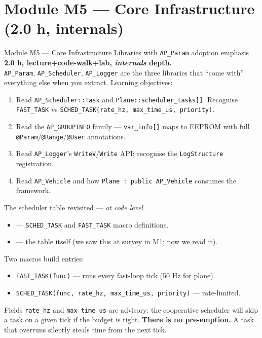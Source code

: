 \documentclass[aspectratio=169,11pt]{beamer}
\begin{document}
\section{Module M5 --- Core Infrastructure (2.0 h, internals)}

\begin{frame}{Module M5 --- Core Infrastructure Libraries with \texttt{AP\_Param} adoption emphasis}
  \textbf{2.0 h, lecture+code-walk+lab, \emph{internals} depth.}\\[1ex]
  \texttt{AP\_Param}, \texttt{AP\_Scheduler}, \texttt{AP\_Logger} are the three libraries that ``come with'' everything else when you extract.
  \vfill
  Learning objectives:
  \begin{enumerate}
    \item Read \texttt{AP\_Scheduler::Task} and \texttt{Plane::scheduler\_tasks[]}. Recognise \texttt{FAST\_TASK} vs \texttt{SCHED\_TASK(rate\_hz, max\_time\_us, priority)}.
    \item Read the \texttt{AP\_GROUPINFO} family --- \texttt{var\_info[]} maps to EEPROM with full \texttt{@Param}/\texttt{@Range}/\texttt{@User} annotations.
    \item Read \texttt{AP\_Logger}'s \texttt{WriteV}/\texttt{Write} API; recognise the \texttt{LogStructure} registration.
    \item Read \texttt{AP\_Vehicle} and how \texttt{Plane : public AP\_Vehicle} consumes the framework.
  \end{enumerate}
\end{frame}

\begin{frame}{The scheduler table revisited --- \emph{at code level}}
  \begin{itemize}
    \item {} --- \texttt{SCHED\_TASK} and \texttt{FAST\_TASK} macro definitions.
    \item {} --- the table itself (we saw this at survey in M1; now we read it).
  \end{itemize}
  \vfill
  Two macros build entries:
  \begin{itemize}
    \item \texttt{FAST\_TASK(func)} --- runs every fast-loop tick (50 Hz for plane).
    \item \texttt{SCHED\_TASK(func, rate\_hz, max\_time\_us, priority)} --- rate-limited.
  \end{itemize}
  \vfill
  Fields \texttt{rate\_hz} and \texttt{max\_time\_us} are advisory: the cooperative scheduler will skip a task on a given tick if the budget is tight. \textbf{There is no pre-emption.} A task that overruns silently steals time from the next tick.
\end{frame}
\end{document}
